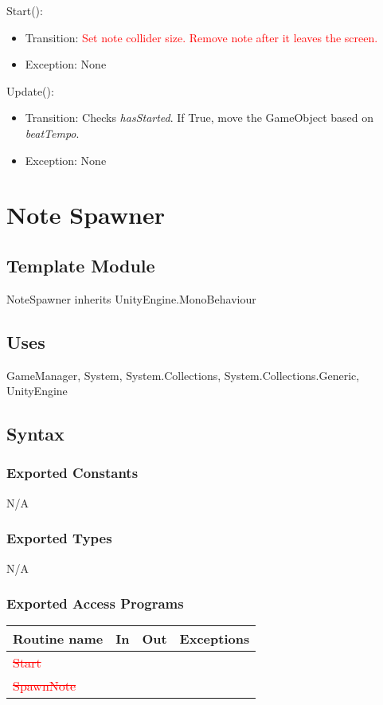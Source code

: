 \documentclass[12pt]{article}
\begin{document}
\noindent Start():
\begin{itemize}
    \item Transition: \textcolor{red}{Set note collider size. Remove note after it leaves the screen.}
    \item Exception: None
\end{itemize}

\noindent Update():
\begin{itemize}
    \item Transition: Checks \textit{hasStarted}. If True, move the GameObject based on \textit{beatTempo}. 
    \item Exception: None
\end{itemize}
\medskip

\newpage
\section{Note Spawner}

\subsection{Template Module}
NoteSpawner inherits UnityEngine.MonoBehaviour

\subsection{Uses}
GameManager, System, System.Collections, System.Collections.Generic, UnityEngine

\subsection{Syntax}
\subsubsection{Exported Constants}
N/A
\subsubsection{Exported Types}
N/A
\subsubsection{Exported Access Programs}
\begin{tabular}{| l | l | l | l |}
\hline
\textbf{Routine name} & \textbf{In} & \textbf{Out} & \textbf{Exceptions}\\
\hline
\textcolor{red}{\sout{Start}}   &     &           &          \\
\textcolor{red}{\sout{SpawnNote}}   &     &           &     \\
\hline
\end{tabular}
\end{document}

